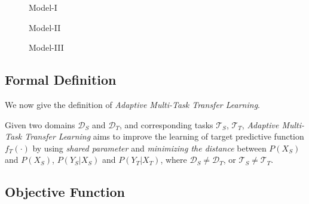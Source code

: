 \begin{figure*}[ht!]
\begin{subfigure}{.33\textwidth}
\def\svgwidth{\textwidth}

\caption{Model-\RN{1}}\label{fig:model_1}
\end{subfigure}
\begin{subfigure}{.33\textwidth}
\def\svgwidth{\textwidth}

\caption{Model-\RN{2}}\label{fig:model_2}
\end{subfigure}
\begin{subfigure}{.33\textwidth}
\def\svgwidth{\textwidth}

\caption{Model-\RN{3}}\label{fig:model_3}
\end{subfigure}
\caption{Three models with different settings. The white block represents Embedding lookup layer, while the gray and black block represents Bi-LSTM layer. The ``SHARED'' in Figure \ref{fig:model_2} stands for shared Bi-LSTM for both tasks. The ``$\mathcal{J}_\textnormal{Adap.}$'' represents \textit{Adaptive} loss for the hidden representation after corresponding layer, which is formally discussed in Sec \ref{sec:objective}. The solid arrow and dotted arrow show the flow of task $a$ and task $b$ respectively.}\label{fig:model}
\end{figure*}

\subsection{Formal Definition}
We now give the definition of \textit{Adaptive Multi-Task Transfer Learning}.

\theoremstyle{definition}
\begin{definition}
Given two domains $\mathcal{D}_S$ and $\mathcal{D}_T$, and corresponding tasks $\mathcal{T}_S$, $\mathcal{T}_T$, \textit{Adaptive Multi-Task Transfer Learning} aims to improve the learning of target predictive function $f_T(\cdot)$ by using \textit{shared parameter} and \textit{minimizing the distance} between $P(X_S)$ and $P(X_S)$, $P(Y_S|X_S)$ and $P(Y_T|X_T)$, where $\mathcal{D}_S \neq \mathcal{D}_T$, or $\mathcal{T}_S \neq \mathcal{T}_T$.
\end{definition}

\subsection{Objective Function}\label{sec:objective}

